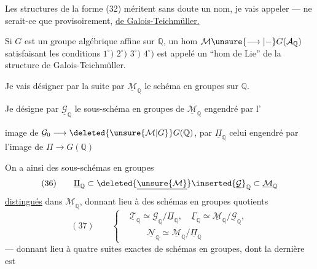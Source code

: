 Les structures de la forme (32) méritent sans doute un nom, je vais  appeler --- ne serait-ce que provisoirement, \uline{ de Galois-Teichmüller.}

Si $G$ est un groupe algébrique affine sur $\mathbb{Q}$, un hom $\mathcal{M}\unsure{\longrightarrow|{-}}G(\mathcal{A}_{\mathbb{Q}})$ satisfaisant les conditions $1^{\circ})$ $2^{\circ})$ $3^{\circ})$  $4^{\circ})$ est appelé un ``hom de Lie'' de la structure de Galois-Teichmüller.

Je vais désigner par la suite par $\underline{\mathcal{M}}_{\mathbb{Q}}$  le schéma en groupes  sur $\mathbb{Q}$. 

Je désigne par  $\underline{\mathcal{G}}_{\mathbb{Q}}$ le sous-schéma en groupes de $\underline{\mathcal{M}}_{\mathbb{Q}}$ engendré par l'

image de $\mathcal{G}_0\longrightarrow\deleted{\unsure{\mathcal{M}|G}}G(\mathbb{Q})$, par $\underline{\Pi}_{\mathbb{Q}}$ celui engendré par l'image de $\Pi\longrightarrow G(\mathbb{Q})$

On a ainsi  des sous-schémas en groupes
\[
(36)\qquad \underline{\Pi}_{\mathbb{Q}}\subset
\deleted{\underline{\unsure{\mathcal{M}}}}\inserted{\underline{\mathcal{G}}}_{\mathbb{Q}}
\subset\underline{\mathcal{M}}_{\mathbb{Q}}
\]
\uline{distingués} dans $\underline{\mathcal{M}}_{\mathbb{Q}}$, donnant lieu à des schémas en groupes quotients
\[
(37)\qquad
\left\{
\begin{aligned}
&\underline{\mathcal{T}}_{\mathbb{Q}}\simeq
\underline{\mathcal{G}}_{\mathbb{Q}}/\underline{\Pi}_{\mathbb{Q}},\quad
\underline{\Gamma}_{\mathbb{Q}}\simeq
\underline{\mathcal{M}}_{\mathbb{Q}}/\underline{\mathcal{G}}_{\mathbb{Q}},\\
&\qquad\underline{\mathcal{N}}_{\mathbb{Q}}\simeq
\underline{\mathcal{M}}_{\mathbb{Q}}/\underline{\Pi}_{\mathbb{Q}}
\end{aligned}
\right.
\]
--- donnant lieu à quatre suites exactes de schémas en groupes, dont la dernière est

